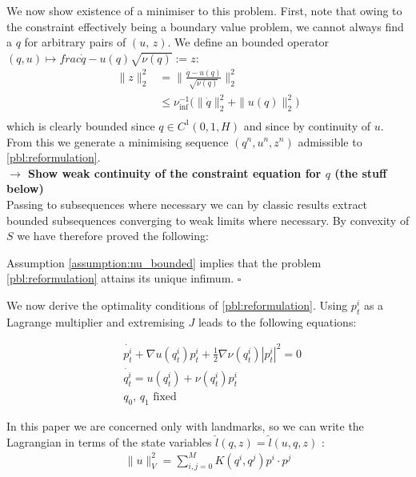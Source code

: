 \documentclass[runningheads]{llncs}
\newcommand{\half}{\frac 12}
\newcommand{\norm}[2]{\| #1 \|_{ #2 }}
\newcommand{\vnorm}[1]{\norm{ #1 }{V}}
\newcommand{\ltwonorm}[1]{\norm{ #1 }{2}}
\newcommand{\nuinf}{\nu_\text{inf}}
\begin{document}
We now show existence of a minimiser to this problem. First, note that owing to
the constraint effectively being a boundary value problem, we cannot always find
a $q$ for arbitrary pairs of $(u,\,z)$. We define an bounded operator
$(q,u)\mapsto frac{\dot{q} - u(q)}{\sqrt{\nu(q)}} := z$:
\begin{align*}
\ltwonorm{z}^2 & = \ltwonorm{\frac{\dot{q} - u(q)}{\sqrt{\nu(q)}}}^2\\
& \leq \nuinf^{-1}\Big(\ltwonorm{\dot{q}}^2 + \ltwonorm{u(q)}^2\Big)\\
\end{align*}
which is clearly bounded since $q\in C^1(0,1,H)$ and since by continuity of $u$.
From this we generate a minimising sequence $(q^n, u^n, z^n)$ admissible to
\eqref{pbl:reformulation}.\\

\textbf{$\longrightarrow$ Show weak continuity of the constraint equation for
$q$ (the stuff below)}\\

Passing to subsequences where necessary we can by classic results
\cite{younes2010shapes} extract bounded subsequences converging to weak limits
where necessary. By convexity of $S$ we have therefore proved the following:

\begin{theorem}
Assumption \ref{assumption:nu_bounded} implies that the problem
\eqref{pbl:reformulation} attains its unique infimum.
{\hfill $\square$}
\end{theorem}

We now derive the optimality conditions of \eqref{pbl:reformulation}.
Using $p_t^i$ as a Lagrange multiplier and extremising $J$ leads to the
following equations:

\begin{align}
& \dot{p_t^i} + \nabla u(q_t^i) p_t^i + \half \nabla \nu(q_t^i) |p_t^i|^2 = 0\\
& \dot{q_t^i} = u(q_t^i) + \nu(q_t^i) p^i_t\\
& q_0,\,q_1\text{ fixed}
\end{align}
  \label{pbm:nonlinear_inner:optimality}

In this paper we are concerned only with
landmarks, so we can write the Lagrangian in terms of the state variables $\hat
l(q, z) = \hat l(u, q, z)$ \cite{younes2010shapes}:
\begin{align*}
\vnorm{u}^2 = \sum_{i,j=0}^M K(q^i,q^j) p^i \cdot p^j
\end{align*}
\end{document}
